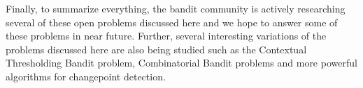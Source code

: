     
    Finally, to summarize everything, the bandit community is actively researching several of these open problems discussed here and we hope to answer some of these problems in near future. Further, several interesting variations of the problems discussed here are also being studied such as the Contextual Thresholding Bandit problem, Combinatorial Bandit problems \citep{cesa2012combinatorial} and more powerful algorithms for changepoint detection.

